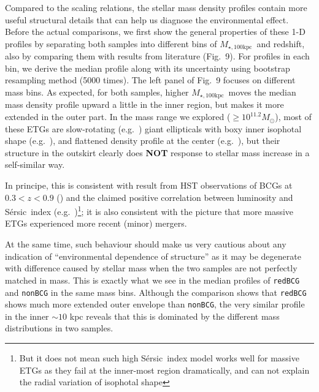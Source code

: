 \documentclass[preprint]{aastex}
\def\ser{{S\'{e}rsic\ }}
\def\mtot{{$M_{\star,100\mathrm{kpc}}$}~}
\begin{document}
\begin{CJK*}{UTF8}{gbsn}
    Compared to the scaling relations, the stellar mass density profiles 
    contain more useful structural details that can help us diagnose the 
    environmental effect.  
    Before the actual comparisons, we first show the general properties 
    of these 1-D profiles by separating both samples into different bins 
    of \mtot and redshift, also by comparing them with results from 
    literature (Fig.~9).   
    For profiles in each bin, we derive the median profile along with its 
    uncertainty using bootstrap resampling method (5000 times). 
    The left panel of Fig.~9 focuses on different mass bins.  
    As expected, for both samples, higher \mtot moves the median mass 
    density profile upward a little in the inner region, but makes it 
    more extended in the outer part.
    In the mass range we explored ($\ge 10^{11.2} M_{\odot}$), most of these 
    ETGs are slow-rotating (e.g.\ \citealt{Cappellari13b}) giant ellipticals 
    with boxy inner isophotal shape (e.g.\ \citealt{Kormendy2009}), and 
    flattened density profile at the center (e.g.\ \citealt{Lauer07}), 
    but their structure in the outskirt clearly does \textbf{NOT} response 
    to stellar mass increase in a self-similar way. 
    
    In principe, this is consistent with result from HST observations of 
    BCGs at $0.3 < z <0.9$ (\citealt{Bai2014}) and the claimed positive 
    correlation between luminosity and \ser index
    (e.g.\ \citealt{Savorgnan13})\footnote{But it does not mean such high 
    \ser index model works well for massive ETGs as they fail at the inner-most 
    region dramatically, and can not explain the radial variation of 
    isophotal shape}; it is also consistent with the picture that more 
    massive ETGs experienced more recent (minor) mergers.  
    
    At the same time, such behaviour should make us very cautious about 
    any indication of ``environmental dependence of structure'' as it 
    may be degenerate with difference caused by stellar mass when the 
    two samples are not perfectly matched in mass.  
    This is exactly what we see in the median profiles of \texttt{redBCG}
    and \texttt{nonBCG} in the same mass bins. 
    Although the comparison shows that \texttt{redBCG} shows much more 
    extended outer envelope than \texttt{nonBCG}, the very similar profile
    in the inner $\sim 10$ kpc reveals that this is dominated by the 
    different mass distributions in two samples. 
    

\end{CJK*}
\end{document}
